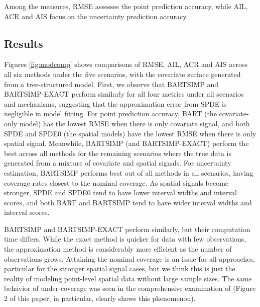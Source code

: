 \documentclass[preprint,12pt,authoryear]{elsarticle}
\begin{document}
{\begin{itemize}
Among the measures, RMSE assesses the point prediction accuracy, while AIL, ACR and AIS focus on the uncertainty prediction accuracy. 
	
\end{itemize} 



\subsection{Results}

{Figures \ref{fig:modcomp} shows comparisons of RMSE, AIL, ACR and AIS across all six methods under the five scenarios, with the covariate surface generated from a tree-structured model.} First, we observe that BARTSIMP and BARTSIMP-EXACT perform similarly for all four metrics { under all scenarios and mechanisms}, suggesting that the approximation error from SPDE is negligible in model fitting. For point prediction accuracy, BART (the covariate-only model) has the lowest RMSE when there is only covariate signal, and both SPDE and SPDE0 (the spatial models) have the lowest RMSE when there is only spatial signal. Meanwhile, BARTSIMP (and BARTSIMP-EXACT) perform the best across all methods for the remaining scenarios where the true data is generated from a mixture of covariate and spatial signals. For uncertainty estimation, BARTSIMP performs best out of all methods in all scenarios, having coverage rates closest to the nominal coverage. As spatial signals become stronger, SPDE and SPDE0 tend to have lower interval widths and interval scores, and both BART and BARTSIMP tend to have wider interval widths and interval scores.

BARTSIMP and BARTSIMP-EXACT perform similarly, but their computation time differs. While the exact method is quicker for data with few observations, the approximation method is considerably more efficient as the number of observations grows. Attaining the nominal coverage is an issue for all approaches, particular for the stronger spatial signal cases, but we think this is just the reality of modeling point-level spatial data without large sample sizes. The same behavior of under-coverage was seen in the comprehensive examination of \cite{osgood2023statistical} (Figure 2 of this paper, in particular, clearly shows this phenomenon). 

}
\end{document}
